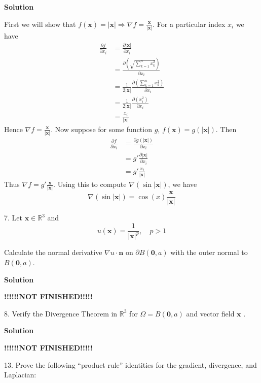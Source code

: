 \documentclass{article}
\begin{document}
\textbf{Solution}

First we will show that
$f(\mathbf{x}) = |\mathbf{x}| \Rightarrow \nabla f = \frac{\mathbf{x}}{|\mathbf{x}|}$.
For a particular index $x_i$ we have
%
\begin{align*}
    \frac{\partial f}{\partial x_i}
        &= \frac{\partial |\mathbf{x}|}{\partial x_i} \\
        &= \frac{\partial (\sqrt{\sum_{k=1}^n x_k^2})}{\partial x_i} \\
        &= \frac{1}{2 |\mathbf{x}|} \frac{\partial (\sum_{k=1}^n x_k^2)}{\partial x_i} \\
        &= \frac{1}{2 |\mathbf{x}|} \frac{\partial (x_i^2)}{\partial x_i} \\
        &= \frac{x_i}{|\mathbf{x}|}
\end{align*}
%
Hence $\nabla f = \frac{\mathbf{x}}{|\mathbf{x}|}$. Now suppose for some
function $g$, $f(\mathbf{x}) = g(|\mathbf{x}|)$. Then
%
\begin{align*}
    \frac{\partial f}{\partial x_i}
        &= \frac{\partial g(|\mathbf{x}|)}{\partial x_i} \\
        &= g' \frac{\partial |\mathbf{x}|}{\partial x_i} \\
        &= g' \frac{x_i}{|\mathbf{x}|}
\end{align*}
%
Thus $\nabla f = g' \frac{\mathbf{x}}{|\mathbf{x}|}$. Using this to
compute $\nabla(\sin |\mathbf{x}|)$, we have
%
\begin{equation*}
    \nabla(\sin |\mathbf{x}|) = \cos(x) \frac{\mathbf{x}}{|\mathbf{x}|}
\end{equation*}

\vspace{5mm}
7. Let $\mathbf{x} \in \mathbb{R}^{3}$ and
$$u(\mathbf{x}) = \frac{1}{|\mathbf{x}|^{p}}, \quad p>1$$

Calculate the normal derivative $\nabla u \cdot \mathbf{n}$ on $\partial
B(\mathbf{0}, a)$ with the outer normal to $B(\mathbf{0}, a)$.

\textbf{Solution}

\quad \textbf{!!!!!!NOT FINISHED!!!!!}

\vspace{5mm}
8. Verify the Divergence Theorem in $\mathbb{R}^{3}$ for
$\Omega = B(\mathbf{0}, a)$ and vector field $\mathbf{x}$ .

\textbf{Solution}

\quad \textbf{!!!!!!NOT FINISHED!!!!!}

\vspace{5mm}
13. Prove the following ``product rule'' identities for the gradient,
divergence, and Laplacian:
\end{document}
